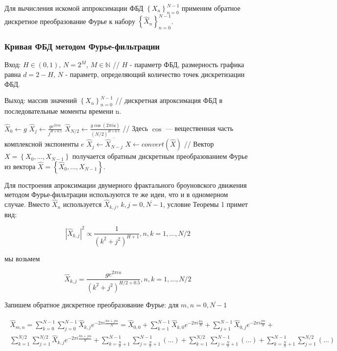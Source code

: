 Для вычисления искомой аппроксимации ФБД $\left\{X_n\right\}_{n=0}^{N-1}$ применим обратное дискретное преобразование Фурье к набору $\left\{\hat{X}_n\right\}_{n=0}^{N-1}$.

\subsubsection{Кривая ФБД методом Фурье-фильтрации}

Вход: $H \in (0,1)$, $N=2^M$, $M \in \mathbb{N}$ // $H$ - параметр ФБД, размерность графика равна $d = 2 - H$, $N$ - параметр, определяющий количество точек дискретизации ФБД.

Выход: массив значений $\left\{X_n\right\}_{n=0}^{N-1}$ // дискретная апроксимация ФБД в последовательные моменты времени n.

\begin{algorithmic}[1]
	\State $\hat{X}_0\gets g$
	\State $\hat{X}_j \gets \frac{ge^{2\pi iu}}{j^{H+0.5}}$
	\EndFor
	\State $\hat{X}_{N/2} \gets \frac{g\cos(2\pi iu)}{(N/2)^{H+0.5}}$ // Здесь $\cos$ — вещественная часть комплексной экспоненты $e$
	\State $\hat{X}_j \gets \overline{\hat{X}_{N-j}}$
	\EndFor
	\State $X \gets convert(\hat{X})$ // Вектор $X = \left\{X_0,...,X_{N-1}\right\}$ получается обратным дискретным преобразованием Фурье из вектора $\hat{X} = \left\{\hat{X}_0,...,\hat{X}_{N-1}\right\}$.
\end{algorithmic}

Для построения апроксимации двумерного фрактального броуновского движения методом Фурье-фильтрации используются те же идеи, что и в одномерном случае. Вместо $\hat{X}_n$ используется $\hat{X}_{k,j}$, $k,j = \overline{0,N-1}$, условие Теоремы 1 примет вид:

\begin{equation}
	|\hat{X}_{k,j}|^2 \propto \frac{1}{(k^2+j^2)^{H+1}}, n,k= 1,...,N/2
\end{equation}

мы возьмем

\begin{equation}
	\hat{X}_{k,j} = \frac{ge^{2\pi iu}}{(k^2+j^2)^{H/2+0.5}}, n,k= 1,...,N/2
\end{equation}

Запишем обратное дискретное преобразование Фурье: для $m,n=\overline{0,N-1}$

\begin{gather}
	\begin{split}
		\hat{X}_{m,n} = \sum_{k=0}^{N-1}\sum_{j=0}^{N-1}\hat{X}_{k,j}e^{-2\pi i \frac{kn+jm}{N}} = \hat{X}_{0,0} + \sum_{k=1}^{N-1}\hat{X}_{k,0}e^{-2\pi i\frac{kn}{N}} + \sum_{j+1}^{N-1}\hat{X}_{0,j}e^{-2\pi i \frac{jm}{N}} + \\
		\sum_{k=1}^{N/2}\sum_{j=1}^{N/2}\hat{X}_{k,j}e^{-2\pi i \frac{kn+jm}{N}} + \sum_{k=\frac{N}{2}+1}^{N-1} \sum_{j=\frac{N}{2}+1}^{N-1}(...) + \sum_{k=1}^{N/2}\sum_{j=\frac{N}{2}+1}^{N-1}(...) + \sum_{k=\frac{N}{2}+1}^{N-1} \sum_{j=1}^{N/2}(...)
	\end{split}
\end{gather}

